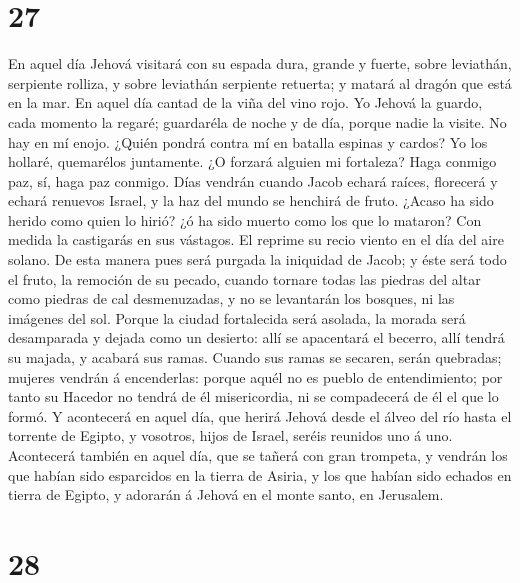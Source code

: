 \hypertarget{section-26}{%
\section{27}\label{section-26}}

 En aquel día Jehová visitará con su espada dura, grande y
fuerte, sobre leviathán, serpiente rolliza, y sobre leviathán serpiente
retuerta; y matará al dragón que está en la mar.  En aquel
día cantad de la viña del vino rojo.  Yo Jehová la guardo,
cada momento la regaré; guardaréla de noche y de día, porque nadie la
visite.  No hay en mí enojo. ¿Quién pondrá contra mí en
batalla espinas y cardos? Yo los hollaré, quemarélos juntamente.
 ¿O forzará alguien mi fortaleza? Haga conmigo paz, sí, haga
paz conmigo.  Días vendrán cuando Jacob echará raíces,
florecerá y echará renuevos Israel, y la haz del mundo se henchirá de
fruto.  ¿Acaso ha sido herido como quien lo hirió? ¿ó ha
sido muerto como los que lo mataron?  Con medida la
castigarás en sus vástagos. El reprime su recio viento en el día del
aire solano.  De esta manera pues será purgada la iniquidad
de Jacob; y éste será todo el fruto, la remoción de su pecado, cuando
tornare todas las piedras del altar como piedras de cal desmenuzadas, y
no se levantarán los bosques, ni las imágenes del sol. 
Porque la ciudad fortalecida será asolada, la morada será desamparada y
dejada como un desierto: allí se apacentará el becerro, allí tendrá su
majada, y acabará sus ramas.  Cuando sus ramas se secaren,
serán quebradas; mujeres vendrán á encenderlas: porque aquél no es
pueblo de entendimiento; por tanto su Hacedor no tendrá de él
misericordia, ni se compadecerá de él el que lo formó.  Y
acontecerá en aquel día, que herirá Jehová desde el álveo del río hasta
el torrente de Egipto, y vosotros, hijos de Israel, seréis reunidos uno
á uno.  Acontecerá también en aquel día, que se tañerá con
gran trompeta, y vendrán los que habían sido esparcidos en la tierra de
Asiria, y los que habían sido echados en tierra de Egipto, y adorarán á
Jehová en el monte santo, en Jerusalem.

\hypertarget{section-27}{%
\section{28}\label{section-27}}


